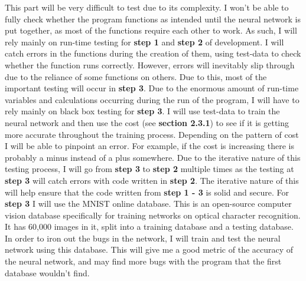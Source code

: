 \documentclass{report}
\begin{document}
This part will be very difficult to test due to its complexity. I won't be able to fully check whether the program functions as intended until the neural network is put together, as most of the functions require each other to work. As such, I will rely mainly on run-time testing for \textbf{step 1} and \textbf{step 2} of development. I will catch errors in the functions during the creation of them, using test-data to check whether the function runs correctly. However, errors will inevitably slip through due to the reliance of some functions on others. Due to this, most of the important testing will occur in \textbf{step 3}. Due to the enormous amount of run-time variables and calculations occurring during the run of the program, I will have to rely mainly on black box testing for \textbf{step 3}. I will use test-data to train the neural network and then use the cost (see \textbf{section 2.3.1}) to see if it is getting more accurate throughout the training process. Depending on the pattern of cost I will be able to pinpoint an error. For example, if the cost is increasing there is probably a minus instead of a plus somewhere. Due to the iterative nature of this testing process, I will go from \textbf{step 3} to \textbf{step 2} multiple times as the testing at \textbf{step 3} will catch errors with code written in \textbf{step 2}. The iterative nature of this will help ensure that the code written from \textbf{step 1 - 3} is solid and secure.
\newline
For \textbf{step 3} I will use the MNIST online database. This is an open-source computer vision database specifically for training networks on optical character recognition. It has 60,000 images in it, split into a training database and a testing database. In order to iron out the bugs in the network, I will train and test the neural network using this database. This will give me a good metric of the accuracy of the neural network, and may find more bugs with the program that the first database wouldn't find.
\end{document}
